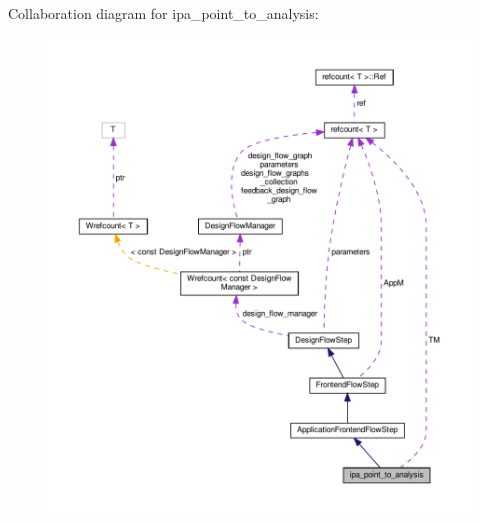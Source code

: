 Collaboration diagram for ipa\+\_\+point\+\_\+to\+\_\+analysis\+:
\nopagebreak
\begin{figure}[H]
\begin{center}
\leavevmode
\includegraphics[width=350pt]{d3/d88/classipa__point__to__analysis__coll__graph}
\end{center}
\end{figure}
